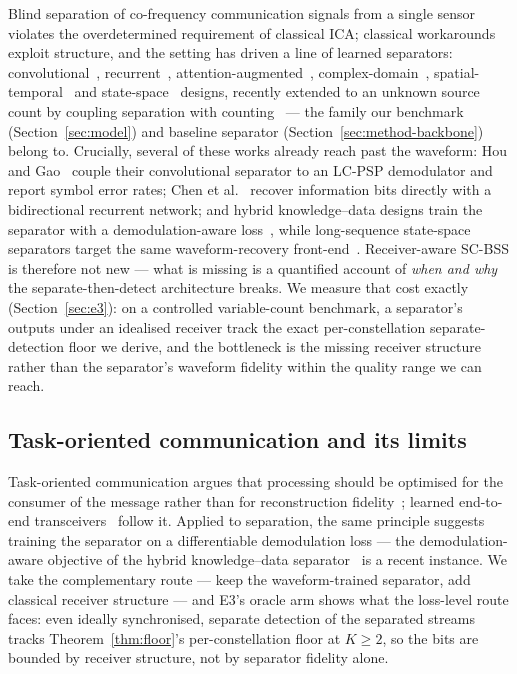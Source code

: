 \documentclass[journal]{IEEEtran}
\begin{document}
Blind separation of co-frequency communication signals from a single
sensor violates the overdetermined requirement of classical
ICA; classical workarounds exploit
structure, and the setting
has driven a line of learned separators: convolutional~\cite{hou2022single},
recurrent~\cite{chen2019deep}, attention-augmented~\cite{ma2023novel},
complex-domain~\cite{guo2024single}, spatial-temporal~\cite{luo2023single}
and state-space~\cite{s4unet2026} designs, recently extended to an
unknown source count by coupling separation with
counting~\cite{edsnet2026} --- the family our benchmark
(Section~\ref{sec:model}) and baseline separator
(Section~\ref{sec:method-backbone}) belong to. Crucially, several of
these works already reach past the waveform: Hou and
Gao~\cite{hou2022single} couple their convolutional separator to an
LC-PSP demodulator and report symbol error rates; Chen et
al.~\cite{chen2019deep} recover information bits directly with a
bidirectional recurrent network; and hybrid knowledge--data designs
train the separator with a demodulation-aware
loss~\cite{luo2026hybrid}, while long-sequence state-space separators
target the same waveform-recovery front-end~\cite{gao2026iqumamba}.
Receiver-aware SC-BSS is therefore not new --- what is missing is a
quantified account of \emph{when and why} the separate-then-detect
architecture breaks. We measure that cost exactly
(Section~\ref{sec:e3}): on a controlled variable-count benchmark, a
separator's outputs under an idealised receiver track the
exact per-constellation separate-detection floor we derive, and the bottleneck is the
missing receiver structure rather than the separator's waveform fidelity
within the quality range we can reach.

\subsection{Task-oriented communication and its limits}

Task-oriented communication argues that processing should be optimised
for the consumer of the message rather than for reconstruction
fidelity~\cite{strinati2021semantic,gunduz2023beyond}; learned
end-to-end transceivers~\cite{oshea2017intro} follow it.
Applied to separation, the same principle suggests training the
separator on a differentiable demodulation loss --- the
demodulation-aware objective of the hybrid knowledge--data
separator~\cite{luo2026hybrid} is a recent instance. We take the
complementary route --- keep the waveform-trained separator, add
classical receiver structure --- and E3's oracle arm shows what the
loss-level route faces: even ideally synchronised, separate detection
of the separated streams tracks Theorem~\ref{thm:floor}'s per-constellation floor at
$K \geq 2$, so the bits are bounded by receiver structure, not by
separator fidelity alone.
\end{document}
